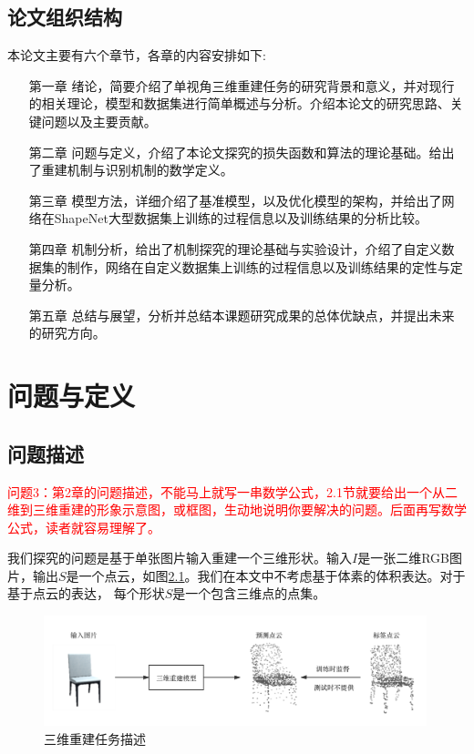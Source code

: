 \documentclass[bachelor, nocolorlinks, printoneside]{seuthesis} %
\newcommand\COMM[1]{\textcolor{red}{#1}}
\begin{document}
\begin{Main}
\section{论文组织结构}
本论文主要有六个章节，各章的内容安排如下:
\begin{itemize}[\hspace{2cm}]
    \item[第一章] 绪论，简要介绍了单视角三维重建任务的研究背景和意义，并对现行的相关理论，模型和数据集进行简单概述与分析。介绍本论文的研究思路、关键问题以及主要贡献。
    \item[第二章] 问题与定义，介绍了本论文探究的损失函数和算法的理论基础。给出了重建机制与识别机制的数学定义。
    \item[第三章] 模型方法，详细介绍了基准模型，以及优化模型的架构，并给出了网络在ShapeNet大型数据集上训练的过程信息以及训练结果的分析比较。
    \item[第四章] 机制分析，给出了机制探究的理论基础与实验设计，介绍了自定义数据集的制作，网络在自定义数据集上训练的过程信息以及训练结果的定性与定量分析。
    \item[第五章] 总结与展望，分析并总结本课题研究成果的总体优缺点，并提出未来的研究方向。
\end{itemize}


\chapter{问题与定义}
\section{问题描述}
\COMM{问题3：第2章的问题描述，不能马上就写一串数学公式，2.1节就要给出一个从二维到三维重建的形象示意图，或框图，生动地说明你要解决的问题。后面再写数学公式，读者就容易理解了。}

我们探究的问题是基于单张图片输入重建一个三维形状。输入$I$是一张二维RGB图片，输出$S$是一个点云，如图\ref{fig:pro_state}。我们在本文中不考虑基于体素的体积表达。对于基于点云的表达，
每个形状$S$是一个包含三维点的点集。

\begin{figure}
    \centering
    \includegraphics[width=0.99\textwidth]{figs/pro_state_demo/problem_statement_demo.png} 
    \caption{三维重建任务描述}
    \label{fig:pro_state}
\end{figure}


\end{Main}
\end{document}
